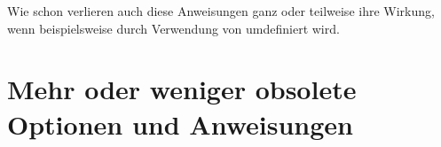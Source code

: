 Wie schon  verlieren
auch diese Anweisungen ganz oder teilweise ihre Wirkung, wenn
 beispielsweise durch Verwendung von
umdefiniert wird.%
\EndIndexGroup


\section{Mehr oder weniger obsolete Optionen und Anweisungen}

%
\EndIndexGroup

\endinput


